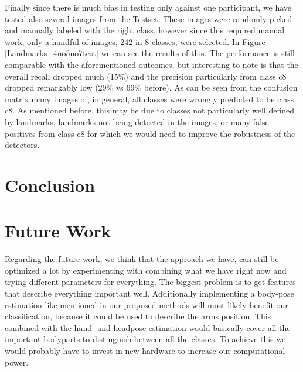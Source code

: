 \documentclass[10pt,twocolumn,letterpaper]{article}
\begin{document}
Finally since there is much bias in testing only against one participant, we have tested also several images from the Testset. These images were randomly picked and manually labeled with the right class, however since this required manual work, only a handful of images, 242 in 8 classes, were selected. In Figure \ref{Landmarks_4no5no7test} we can see the results of this. The performance is still comparable with the aforementioned outcomes, but interesting to note is that the overall recall dropped much (15\%) and the precision particularly from class c8 dropped remarkably low (29\% vs 69\% before). As can be seen from the confusion matrix many images of, in general, all classes were wrongly predicted to be class c8. As mentioned before, this may be due to classes not particularly well defined by landmarks, landmarks not being detected in the images, or many false positives from class c8 for which we would need to improve the robustness of the detectors.

\section{Conclusion}


\section{Future Work}
Regarding the future work, we think that the approach we have, can still be optimized a lot by experimenting with combining what we have right now and trying different parameters for everything. The biggest problem is to get features that describe everything important well. Additionally implementing a body-pose estimation like mentioned in our proposed methods will most likely benefit our classification, because it could be used to describe the arms position. This combined with the hand- and headpose-estimation would basically cover all the important bodyparts to distinguish between all the classes. To achieve this we would probably have to invest in new hardware to increase our computational power.





{\small


}
\end{document}
